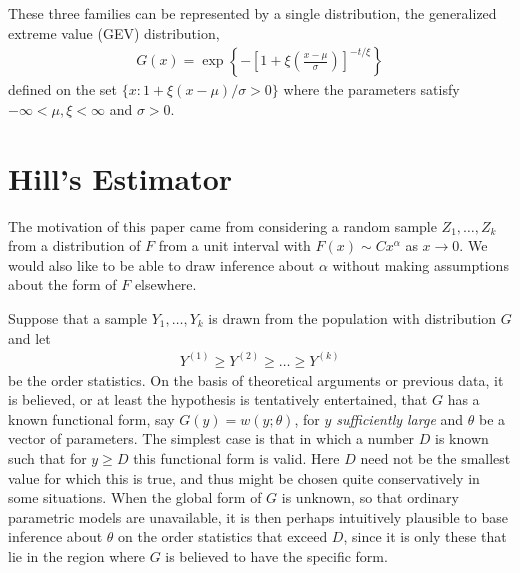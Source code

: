 \documentclass[a4paper,10pt]{article}
\theoremstyle{definition}
\numberwithin{equation}{section}
\begin{document}
These three families can be represented by a single distribution, the generalized extreme value (GEV) distribution,
\begin{align*}
G(x) = \exp \left\{-\left[1+\xi\left(\frac{x-\mu}{\sigma}\right)\right]^{-t/\xi}\right\}
\end{align*}
defined on the set $\{x : 1 + \xi(x-\mu)/\sigma>0\}$ where the parameters satisfy $-\infty<\mu, \xi<\infty$ and $\sigma >0$.




\section{Hill's Estimator}
The motivation of this paper came from considering a random sample $Z_1, \ldots, Z_k$ from a distribution of $F$ from a unit interval with $F(x) \sim Cx^\alpha$ as $x\to 0$. We would also like to be able to draw inference about $\alpha$ without making assumptions about the form of $F$ elsewhere.

Suppose that a sample $Y_1,\ldots,Y_k$ is drawn from the population with distribution $G$ and let 
\begin{align*}
Y^{(1)} \geq Y^{(2)} \geq \ldots \geq Y^{(k)}
\end{align*}
be the order statistics. On the basis of theoretical arguments or previous data, it is believed, or at least the hypothesis is tentatively entertained, that $G$ has a known functional form, say $G(y) = w(y;\theta)$, for \emph{$y$ sufficiently large} and $\theta$ be a vector of parameters. The simplest case is that in which a number $D$ is known such that for $y \geq D$ this functional form is valid. Here $D$ need not be the smallest value for which this is true, and thus might be chosen quite conservatively in some situations. When the global form of $G$ is unknown, so that ordinary parametric models are unavailable, it is then perhaps intuitively plausible to base inference about $\theta$ on the order statistics that exceed $D$, since it is only these that lie in the region where $G$ is believed to have the specific form.



%	
\end{document}
